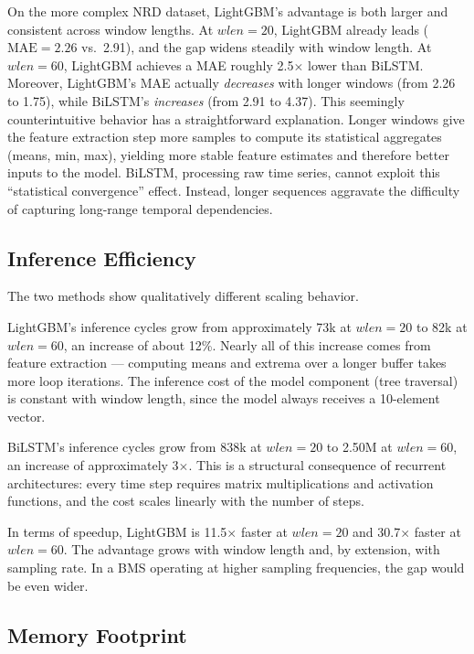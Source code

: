 On the more complex NRD dataset, LightGBM's advantage is both larger and consistent across window lengths. At $wlen = 20$, LightGBM already leads ($\text{MAE} = 2.26$ vs.\ 2.91), and the gap widens steadily with window length. At $wlen = 60$, LightGBM achieves a MAE roughly 2.5$\times$ lower than BiLSTM. Moreover, LightGBM's MAE actually \emph{decreases} with longer windows (from 2.26 to 1.75), while BiLSTM's \emph{increases} (from 2.91 to 4.37). This seemingly counterintuitive behavior has a straightforward explanation. Longer windows give the feature extraction step more samples to compute its statistical aggregates (means, min, max), yielding more stable feature estimates and therefore better inputs to the model. BiLSTM, processing raw time series, cannot exploit this ``statistical convergence'' effect. Instead, longer sequences aggravate the difficulty of capturing long-range temporal dependencies.



\subsection{Inference Efficiency}

The two methods show qualitatively different scaling behavior.

LightGBM's inference cycles grow from approximately 73k at $wlen = 20$ to 82k at $wlen = 60$, an increase of about 12\%. Nearly all of this increase comes from feature extraction --- computing means and extrema over a longer buffer takes more loop iterations. The inference cost of the model component (tree traversal) is constant with window length, since the model always receives a 10-element vector.

BiLSTM's inference cycles grow from 838k at $wlen = 20$ to 2.50M at $wlen = 60$, an increase of approximately 3$\times$. This is a structural consequence of recurrent architectures: every time step requires matrix multiplications and activation functions, and the cost scales linearly with the number of steps.

In terms of speedup, LightGBM is 11.5$\times$ faster at $wlen = 20$ and 30.7$\times$ faster at $wlen = 60$. The advantage grows with window length and, by extension, with sampling rate. In a BMS operating at higher sampling frequencies, the gap would be even wider.

\subsection{Memory Footprint}

